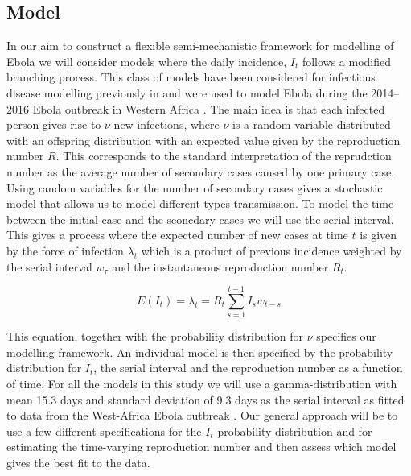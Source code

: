 \documentclass[12pt]{article}
\begin{document}
\subsection{Model}

In our aim to construct a flexible semi-mechanistic framework for modelling of Ebola we will consider models where the daily incidence, $I_t$ follows a modified branching process\cite{jacobBranchingProcessesTheir2010}. This class of models have been considered for infectious disease modelling previously in\cite{coriNewFrameworkSoftware2013,lloyd-smithSuperspreadingEffectIndividual2005,nouvelletSimpleApproachMeasure2018} and were used to model Ebola during the 2014--2016 Ebola outbreak in Western Africa \cite{whoebolaresponseteamEbolaVirusDisease2014, internationalebolaresponseteamExposurePatternsDriving2016}. The main idea is that each infected person gives rise to $\nu$ new infections, where $\nu$ is a random variable distributed with an offspring distribution with an expected value given by the reproduction number $R$. This corresponds to the standard interpretation of the reprudction number as the average number of secondary cases caused by one primary case. Using random variables for the number of secondary cases gives a stochastic model that allows us to model different types transmission. To model the time between the initial case and the seoncdary cases we will use the serial interval. This gives a process where the expected number of new cases at time $t$ is given by the force of infection $\lambda_t$ which is a product of previous incidence weighted by the serial interval $w_\tau$ and the instantaneous reproduction number $R_t$. 

\begin{equation}
  E(I_t) = \lambda_t =  R_t \sum^{t-1}_{s=1} I_s w_{t-s}
  \label{eq:mean_It}
\end{equation}

This equation, together with the probability distribution for $\nu$ specifies our modelling framework. An individual model is then specified by the probability distribution for $I_t$, the serial interval and the reproduction number as a function of time. For all the models in this study we will use a gamma-distribution with mean 15.3 days and standard deviation of 9.3 days as the serial interval as fitted to data from the West-Africa Ebola outbreak \cite{whoebolaresponseteamEbolaVirusDisease2014}. Our general approach will be to use a few different specifications for the $I_t$ probability distribution and for estimating the time-varying reproduction number and then assess which model gives the best fit to the data.
\end{document}
